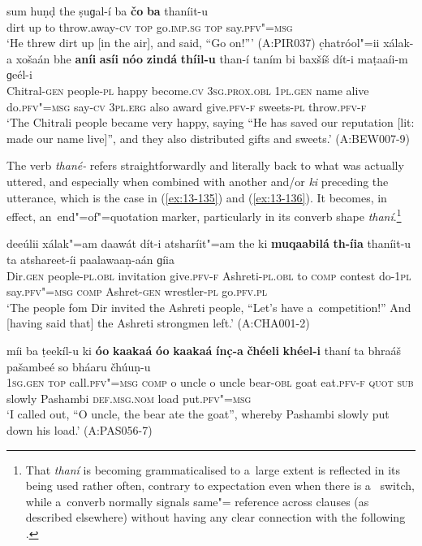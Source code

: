 \ea
\label{ex:13-133}
\gll sum huṇḍ the ṣuɡal-í ba \textbf{čo} \textbf{ba}  thaníit-u \\
dirt up to throw.away-\textsc{cv} \textsc{top} go.\textsc{imp.sg} \textsc{top} say.\textsc{pfv"=msg} \\
\glt `He threw dirt up [in the air], and said, ``Go on!''' (A:PIR037)
\ex
\label{ex:13-134}
\gll c̣hatróol"=ii xálak-a xošaán bhe \textbf{aníi} \textbf{asíi} \textbf{nóo} \textbf{zindá} \textbf{thíil-u} than-í taním bi baxšíš dít-i maṭaaíi-m ɡeél-i\\
Chitral-\textsc{gen} people-\textsc{pl} happy become.\textsc{cv} \textsc{3sg.prox.obl} \textsc{1pl.gen} name alive do.\textsc{pfv"=msg} say-\textsc{cv} \textsc{3pl.erg} also award give.\textsc{pfv-f} sweets-\textsc{pl} throw.\textsc{pfv-f}\\
\glt `The Chitrali people became very happy, saying ``He has saved our reputation [lit: made our name live]'', and they also distributed gifts and sweets.' (A:BEW007-9) 
\z

The verb \textit{thané-} refers straightforwardly and literally back to what was actually uttered,
and especially when combined with another  and/or \textit{ki} preceding the
utterance, which is the case in (\ref{ex:13-135}) and (\ref{ex:13-136}). It becomes, in effect,
an~end"=of"=quotation marker, particularly in its converb shape \textit{thaní}.\footnote{That
  \textit{thaní} is becoming grammaticalised to a~large extent is reflected in its being used rather
  often, contrary to expectation even when there is a~ switch, while a~converb normally
  signals same"= reference across clauses (as described elsewhere) without having any clear connection with the following .}

\ea
\label{ex:13-135}
\gll deeúlii xálak"=am daawát dít-i atsharíit"=am the ki \textbf{muqaabilá} \textbf{th-íia} thaníit-u ta atshareet-íi paalawaaṇ-aán ɡíia\\
Dir.\textsc{gen} people-\textsc{pl.obl} invitation give.\textsc{pfv-f}  Ashreti-\textsc{pl.obl} to \textsc{comp} contest do-\textsc{1pl} say.\textsc{pfv"=msg} \textsc{comp} Ashret-\textsc{gen} wrestler-\textsc{pl} go.\textsc{pfv.pl}\\
\glt `The people fom Dir invited the Ashreti people, ``Let's have a~competition!'' And [having said that] the Ashreti strongmen left.' (A:CHA001-2)

\ex
\label{ex:13-136}
\gll míi ba ṭeekíl-u ki \textbf{óo} \textbf{kaakaá} \textbf{óo} \textbf{kaakaá} \textbf{ínc̣-a} \textbf{čhéeli}  \textbf{khéel-i} thaní ta bhraáš pašambeé so bháaru čhúuṇ-u\\
\textsc{1sg.gen} \textsc{top} call.\textsc{pfv"=msg} \textsc{comp} o uncle o uncle bear-\textsc{obl} goat  eat.\textsc{pfv-f} \textsc{quot } \textsc{sub} slowly Pashambi \textsc{def.msg.nom} load put.\textsc{pfv"=msg}  \\
\glt `I called out, ``O uncle, the bear ate the goat'', whereby Pashambi slowly put down his load.' (A:PAS056-7) 
\z

